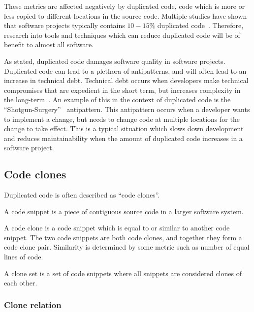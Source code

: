 These metrics are affected negatively by duplicated code, code which is more or less
copied to different locations in the source code. Multiple studies have shown that
software projects typically contains $10-15\%$ duplicated code~\cite{CloningByAccident}.
Therefore, research into tools and techniques which can reduce duplicated code will be of
benefit to almost all software.

As stated, duplicated code damages software quality in software projects. Duplicated code
can lead to a plethora of antipatterns, and will often lead to an increase in technical
debt. Technical debt occurs when developers make technical compromises that are expedient
in the short term, but increases complexity in the long-term~\cite[111]{TechnicalDebt}. An
example of this in the context of duplicated code is the
``Shotgun-Surgery''~\cite[66]{fowlerrefactoring} antipattern. This antipattern occurs when
a developer wants to implement a change, but needs to change code at multiple locations
for the change to take effect. This is a typical situation which slows down development
and reduces maintainability when the amount of duplicated code increases in a software
project.

\subsection{Code clones}

Duplicated code is often described as ``code clones''.

\begin{definition}
	A code snippet is a piece of contiguous source code in a larger software system.
\end{definition}

\begin{definition}
	A code clone is a code snippet which is equal to or similar to another code snippet. The two
	code snippets are both code clones, and together they form a code clone pair.
	Similarity is determined by some metric such as number of equal lines of code.
\end{definition}

\begin{definition}
	A clone set is a set of code snippets where all snippets are considered clones of each
	other.
\end{definition}

\subsubsection{Clone relation}

